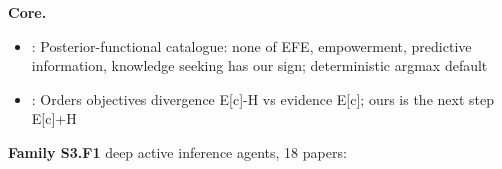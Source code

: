 \documentclass[10pt]{article}
\newcommand{\memb}[1]{\par\smallskip\textbf{#1}\quad}
\begin{document}
\memb{Core.}
\begin{itemize}[nosep,leftmargin=1.2em]
\item \citet{Biehl-expanding18}: Posterior-functional catalogue: none of EFE, empowerment, predictive information, knowledge seeking has our sign; deterministic argmax default
\item \citet{Millidge-understanding21}: Orders objectives divergence E[c]-H vs evidence E[c]; ours is the next step E[c]+H
\end{itemize}
\memb{Family S3.F1} deep active inference agents, 18 papers: {\footnotesize \citetext{\citealp{Ueltzhoffer-deep18}; \citealp{Fountas-deep20}; \citealp{Millidge-deep20}; \citealp{Tschantz-scaling20}; \citealp{Millidge-successor22}; \citealp{Champion-deconstructing24}; \citealp{Cullen-active18}; \citealp{Catal-learning20}; \citealp{Sancaktar-end20}; \citealp{vanderHimst-deep20}; \citealp{Mazzaglia-contrastive21}; \citealp{Noel-online21}; \citealp{vanHoeffelen-deep21}; \citealp{Baioumy-unbiased22}; \citealp{Champion-branching22a}; \citealp{Champion-branching22b}; \citealp{Yeganeh-deep25}; \citealp{Akgul-distributional26}}}
\end{document}
